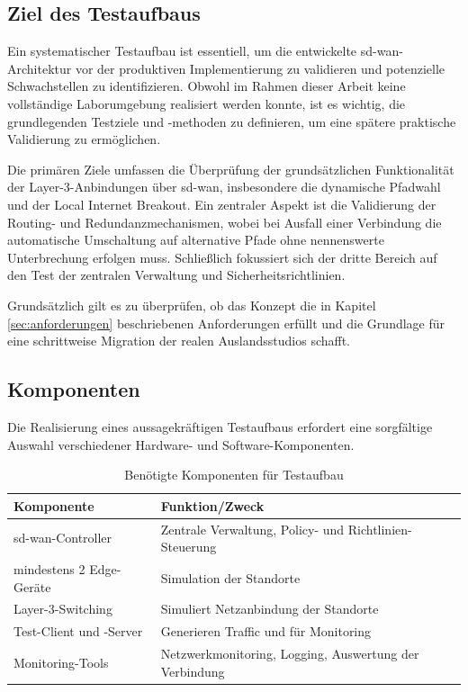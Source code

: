 
\subsection*{Ziel des Testaufbaus}
Ein systematischer Testaufbau ist essentiell, um die entwickelte \ac{sd-wan}-Architektur vor der produktiven Implementierung zu validieren und potenzielle Schwachstellen zu identifizieren. Obwohl im Rahmen dieser Arbeit keine vollständige Laborumgebung realisiert werden konnte, ist es wichtig, die grundlegenden Testziele und -methoden zu definieren, um eine spätere praktische Validierung zu ermöglichen. 

Die primären Ziele umfassen die Überprüfung der grundsätzlichen Funktionalität der Layer-3-Anbindungen über \ac{sd-wan}, insbesondere die dynamische Pfadwahl und der Local Internet Breakout. Ein zentraler Aspekt ist die Validierung der Routing- und Redundanzmechanismen, wobei bei Ausfall einer Verbindung die automatische Umschaltung auf alternative Pfade ohne nennenswerte Unterbrechung erfolgen muss. Schließlich fokussiert sich der dritte Bereich auf den Test der zentralen Verwaltung und Sicherheitsrichtlinien.

Grundsätzlich gilt es zu überprüfen, ob das Konzept die in Kapitel \ref{sec:anforderungen} beschriebenen Anforderungen erfüllt und die Grundlage für eine schrittweise Migration der realen Auslandsstudios schafft.

\subsection*{Komponenten}
Die Realisierung eines aussagekräftigen Testaufbaus erfordert eine sorgfältige Auswahl verschiedener Hardware- und Software-Komponenten.

\begin{table}[H]
	\centering
	\begin{tabularx}{\textwidth}{lX}
		Komponente & Funktion/Zweck \\
		\hline
		\ac{sd-wan}-Controller & Zentrale Verwaltung, Policy- und Richtlinien-Steuerung \\
		mindestens 2 Edge-Geräte & Simulation der Standorte \\
		Layer-3-Switching & Simuliert Netzanbindung der Standorte \\
		Test-Client und -Server & Generieren Traffic und für Monitoring \\
		Monitoring-Tools & Netzwerkmonitoring, Logging, Auswertung der Verbindung \\ 
	\end{tabularx}
	\caption{Benötigte Komponenten für Testaufbau}
\end{table}

